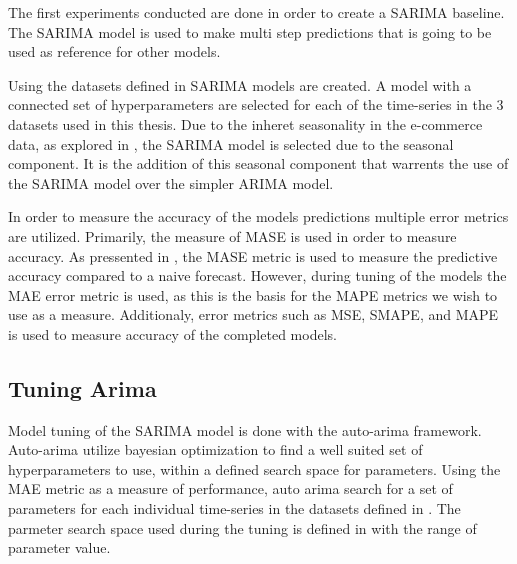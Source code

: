 \iffalse



The first experiments conducted are done in order to create a SARIMA baseline.
The SARIMA model is used to make multi step predictions that is going to be used as reference for other models.

Using the datasets defined in  SARIMA models are created.
A model with a connected set of hyperparameters are selected for each of the time-series in the 3 datasets used in this thesis.
Due to the inheret seasonality in the e-commerce data, as explored in ,
the SARIMA model is selected due to the seasonal component.
It is the addition of this seasonal component that warrents the use of the SARIMA model over the simpler ARIMA model.

In order to measure the accuracy of the models predictions multiple error metrics are utilized.
Primarily, the measure of MASE is used in order to measure accuracy.
As pressented in , the MASE metric is used to measure the predictive accuracy
compared to a naive forecast.
However, during tuning of the models the MAE error metric is used, as this is the basis for the MAPE metrics we wish to use as a measure.
Additionaly, error metrics such as MSE, SMAPE, and MAPE is used to measure accuracy of the completed models.

\subsection{Tuning Arima}
Model tuning of the SARIMA model is done with the auto-arima framework.
Auto-arima utilize bayesian optimization to find a well suited set of hyperparameters to use,
within a defined search space for parameters.
Using the MAE metric as a measure of performance, auto arima search for a set of parameters for each individual time-series
in the datasets defined in .
The parmeter search space used during the tuning is defined in  with the range of parameter value.

